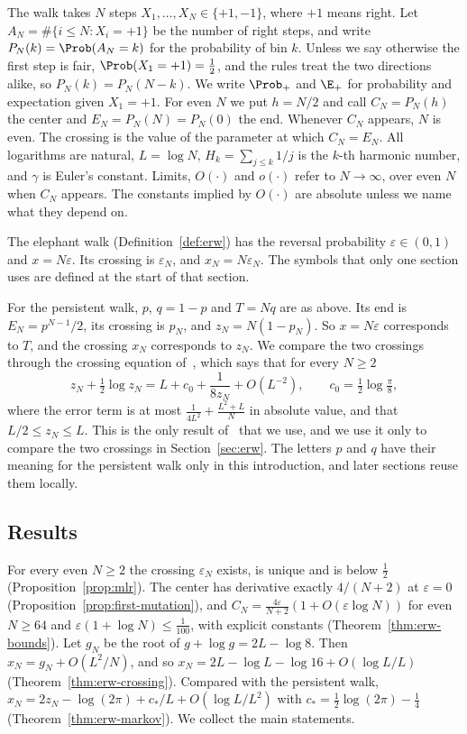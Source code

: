 The walk takes $N$ steps $X_1,\dots,X_N\in\{+1,-1\}$, where
$+1$ means right. Let $A_N=\#\{i\le N:X_i=+1\}$ be the number of right steps,
and write $P_N(k)=\Prob(A_N=k)$ for the probability of bin $k$. Unless we say otherwise the first
step is fair, $\Prob(X_1=+1)=\frac12$, and the rules treat the two directions
alike, so $P_N(k)=P_N(N-k)$. We write $\Prob_+$ and $\E_+$ for probability and
expectation given $X_1=+1$. For even $N$ we put $h=N/2$ and call
$C_N=P_N(h)$ the center and $E_N=P_N(N)=P_N(0)$ the end. Whenever $C_N$
appears, $N$ is even. The crossing is the value of the parameter at which
$C_N=E_N$. All logarithms are natural, $L=\log N$,
$H_k=\sum_{j\le k}1/j$ is the $k$-th harmonic number, and $\gamma$ is Euler's
constant. Limits, $O(\cdot)$ and $o(\cdot)$ refer to $N\to\infty$, over even
$N$ when $C_N$ appears. The constants implied by $O(\cdot)$ are absolute
unless we name what they depend on.

The elephant walk (Definition~\ref{def:erw}) has the reversal probability
$\varepsilon\in(0,1)$ and $x=N\varepsilon$. Its crossing is $\varepsilon_N$,
and $x_N=N\varepsilon_N$. The symbols that only one section uses are defined at the start
of that section.

For the persistent walk, $p$, $q=1-p$ and $T=Nq$ are as above. Its end is
$E_N=p^{N-1}/2$, its crossing is $p_N$, and $z_N=N(1-p_N)$. So $x=N\varepsilon$
corresponds to $T$, and the crossing $x_N$ corresponds to $z_N$. We compare the
two crossings through the crossing equation of~\cite[Proposition~3.8]{paperA},
which says that for every $N\ge2$
\begin{equation}\label{eq:markov-crossing}
 z_N+\tfrac12\log z_N=L+c_0+\frac1{8z_N}+O(L^{-2}),\qquad
 c_0=\tfrac12\log\tfrac\pi8,
\end{equation}
where the error term is at most $\frac1{4L^2}+\frac{L^2+L}N$ in absolute
value, and that $L/2\le z_N\le L$. This is the only result of~\cite{paperA}
that we use, and we use it only to compare the two crossings in
Section~\ref{sec:erw}. The letters $p$ and $q$ have their meaning
for the persistent walk only in this introduction, and later sections reuse
them locally.

\subsection{Results}\label{sec:results}

For every even $N\ge2$ the crossing $\varepsilon_N$ exists, is unique and is
below $\frac12$ (Proposition~\ref{prop:mlr}). The center has derivative
exactly $4/(N+2)$ at $\varepsilon=0$
(Proposition~\ref{prop:first-mutation}), and
$C_N=\frac{4\varepsilon}{N+2}(1+O(\varepsilon\log N))$ for even $N\ge64$ and
$\varepsilon(1+\log N)\le\frac1{100}$, with explicit constants
(Theorem~\ref{thm:erw-bounds}). Let $g_N$ be the root of
$g+\log g=2L-\log8$. Then $x_N=g_N+O(L^2/N)$, and so
$x_N=2L-\log L-\log16+O(\log L/L)$ (Theorem~\ref{thm:erw-crossing}). Compared
with the persistent walk, $x_N=2z_N-\log(2\pi)+c_*/L+O(\log L/L^2)$ with
$c_*=\frac12\log(2\pi)-\frac14$ (Theorem~\ref{thm:erw-markov}). We collect
the main statements.

